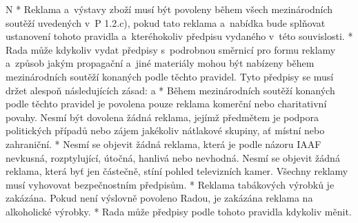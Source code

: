 \begitems \style N
* Reklama a~výstavy zboží musí být povoleny během všech mezinárodních soutěží uvedených v~P 1.2.c), pokud tato reklama a~nabídka bude splňovat ustanovení tohoto pravidla a~kteréhokoliv předpisu vydaného v~této souvislosti.
* Rada může kdykoliv vydat předpisy s~podrobnou směrnicí pro formu reklamy a~způsob jakým propagační a~jiné materiály mohou být nabízeny během mezinárodních soutěží konaných podle těchto pravidel. Tyto předpisy se musí držet alespoň následujících zásad:
  \begitems \style a
  * Během mezinárodních soutěží konaných podle těchto pravidel je povolena pouze reklama komerční nebo charitativní povahy. Nesmí být dovolena žádná reklama, jejímž předmětem je podpora politických případů nebo zájem jakékoliv nátlakové skupiny, ať místní nebo zahraniční.
  * Nesmí se objevit žádná reklama, která je podle názoru IAAF nevkusná, rozptylující, útočná, hanlivá nebo nevhodná. Nesmí se objevit žádná reklama, která byť jen částečně, stíní pohled televizních kamer. Všechny reklamy musí vyhovovat bezpečnostním předpisům.
  * Reklama tabákových výrobků je zakázána. Pokud není výslovně povoleno Radou, je zakázána reklama na alkoholické výrobky.
  \enditems
* Rada může předpisy podle tohoto pravidla kdykoliv měnit.
\enditems

\endinput